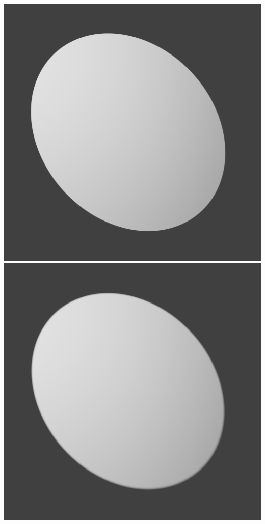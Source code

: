 \documentclass[11pt,class=report,crop=false]{standalone}
\begin{document}
\begin{center}
	\includegraphics[scale=\myscale,scale=0.1]{figures/spot-01}\quad
	\includegraphics[scale=\myscale,scale=0.1]{figures/spot-02}\quad

\end{center}
\end{document}
